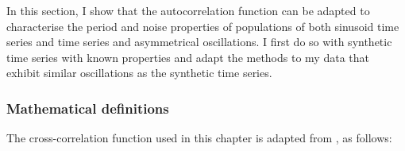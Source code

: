 In this section, I show that the autocorrelation function can be adapted to characterise the period and noise properties of populations of both sinusoid time series and time series and asymmetrical oscillations.
I first do so with synthetic time series with known properties and adapt the methods to my data that exhibit similar oscillations as the synthetic time series.

\subsubsection{Mathematical definitions}
\label{subsubsec:analysis-characterisation-acf-maths}

The cross-correlation function used in this chapter is adapted from \textcite{pietschDeterminingGrowthRates2023}, as follows:

